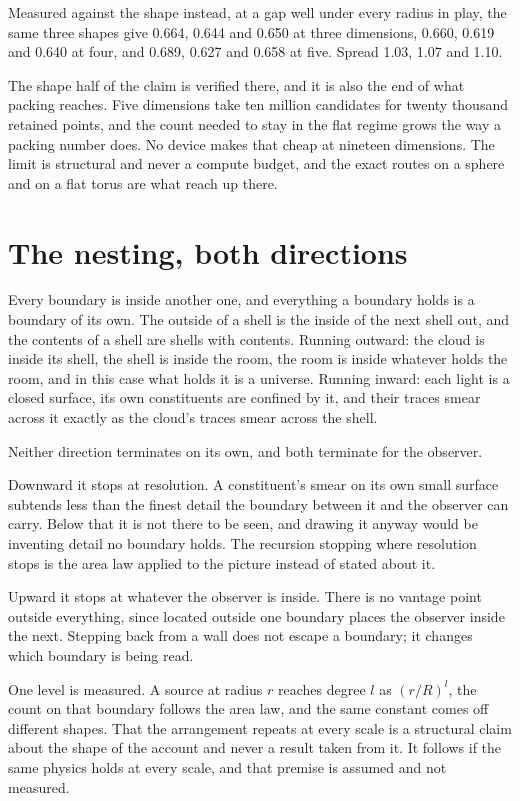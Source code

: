 Measured against the shape instead, at a gap well under every radius in play, the same three shapes
give 0.664, 0.644 and 0.650 at three dimensions, 0.660, 0.619 and 0.640 at four, and 0.689, 0.627
and 0.658 at five. Spread 1.03, 1.07 and 1.10.

The shape half of the claim is verified there, and it is also the end of what packing reaches. Five
dimensions take ten million candidates for twenty thousand retained points, and the count needed to stay
in the flat regime grows the way a packing number does. No device makes that cheap at nineteen
dimensions. The limit is structural and never a compute budget, and the exact routes on a sphere and
on a flat torus are what reach up there.

\section{The nesting, both directions}

Every boundary is inside another one, and everything a boundary holds is a boundary of its own. The
outside of a shell is the inside of the next shell out, and the contents of a shell are shells with
contents. Running outward: the cloud is inside its shell, the shell is inside the room, the room is
inside whatever holds the room, and in this case what holds it is a universe. Running inward: each
light is a closed surface, its own constituents are confined by it, and their traces smear across it
exactly as the cloud's traces smear across the shell.

Neither direction terminates on its own, and both terminate for the observer.

Downward it stops at resolution. A constituent's smear on its own small surface subtends less than
the finest detail the boundary between it and the observer can carry. Below that it is not there
to be seen, and drawing it anyway would be inventing detail no boundary holds. The recursion
stopping where resolution stops is the area law applied to the picture instead of stated about it.

Upward it stops at whatever the observer is inside. There is no vantage point outside everything,
since located outside one boundary places the observer inside the next. Stepping back from a wall
does not escape a boundary; it changes which boundary is being read.

One level is measured. A source at radius $r$ reaches degree $l$ as $(r/R)^l$, the count on that
boundary follows the area law, and the same constant comes off different shapes. That the
arrangement repeats at every scale is a structural claim about the shape of the account and never a
result taken from it. It follows if the same physics holds at every scale, and that premise is
assumed and not measured.
